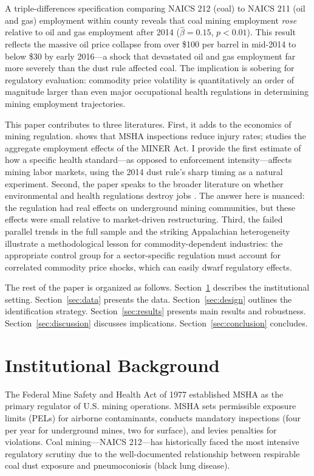 \documentclass[12pt]{article}
\begin{document}
A triple-differences specification comparing NAICS 212 (coal) to NAICS 211 (oil and gas) employment within county reveals that coal mining employment \emph{rose} relative to oil and gas employment after 2014 ($\hat{\beta} = 0.15$, $p < 0.01$). This result reflects the massive oil price collapse from over \$100 per barrel in mid-2014 to below \$30 by early 2016---a shock that devastated oil and gas employment far more severely than the dust rule affected coal. The implication is sobering for regulatory evaluation: commodity price volatility is quantitatively an order of magnitude larger than even major occupational health regulations in determining mining employment trajectories.

This paper contributes to three literatures. First, it adds to the economics of mining regulation. \citet{morantz2013coal} shows that MSHA inspections reduce injury rates; \citet{li2022miner} studies the aggregate employment effects of the MINER Act. I provide the first estimate of how a specific health standard---as opposed to enforcement intensity---affects mining labor markets, using the 2014 dust rule's sharp timing as a natural experiment. Second, the paper speaks to the broader literature on whether environmental and health regulations destroy jobs \citep{greenstone2012does, curtis2018environmental, walker2013transitional}. The answer here is nuanced: the regulation had real effects on underground mining communities, but these effects were small relative to market-driven restructuring. Third, the failed parallel trends in the full sample and the striking Appalachian heterogeneity illustrate a methodological lesson for commodity-dependent industries: the appropriate control group for a sector-specific regulation must account for correlated commodity price shocks, which can easily dwarf regulatory effects.

The rest of the paper is organized as follows. Section~\ref{sec:background} describes the institutional setting. Section~\ref{sec:data} presents the data. Section~\ref{sec:design} outlines the identification strategy. Section~\ref{sec:results} presents main results and robustness. Section~\ref{sec:discussion} discusses implications. Section~\ref{sec:conclusion} concludes.


\section{Institutional Background}
\label{sec:background}

The Federal Mine Safety and Health Act of 1977 established MSHA as the primary regulator of U.S. mining operations. MSHA sets permissible exposure limits (PELs) for airborne contaminants, conducts mandatory inspections (four per year for underground mines, two for surface), and levies penalties for violations. Coal mining---NAICS 212---has historically faced the most intensive regulatory scrutiny due to the well-documented relationship between respirable coal dust exposure and pneumoconiosis (black lung disease).
\end{document}
